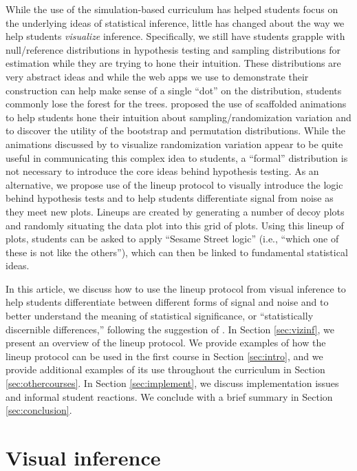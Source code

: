 \documentclass[12pt]{article}
\begin{document}
While the use of the simulation-based curriculum has helped students
focus on the underlying ideas of statistical inference, little has
changed about the way we help students \emph{visualize} inference.
Specifically, we still have students grapple with null/reference
distributions in hypothesis testing and sampling distributions for
estimation while they are trying to hone their intuition. These
distributions are very abstract ideas and while the web apps we use to
demonstrate their construction can help make sense of a single ``dot''
on the distribution, students commonly lose the forest for the trees.
\citet{wild2017} proposed the use of scaffolded animations to help
students hone their intuition about sampling/randomization variation and
to discover the utility of the bootstrap and permutation distributions.
While the animations discussed by \citet{wild2017} to visualize
randomization variation appear to be quite useful in communicating this
complex idea to students, a ``formal'' distribution is not necessary to
introduce the core ideas behind hypothesis testing. As an alternative,
we propose use of the lineup protocol \citep{Buja-2009bd} to visually
introduce the logic behind hypothesis tests and to help students
differentiate signal from noise as they meet new plots. Lineups are
created by generating a number of decoy plots and randomly situating the
data plot into this grid of plots. Using this lineup of plots, students
can be asked to apply ``Sesame Street logic'' (i.e., ``which one of
these is not like the others''), which can then be linked to fundamental
statistical ideas.

In this article, we discuss how to use the lineup protocol from visual
inference to help students differentiate between different forms of
signal and noise and to better understand the meaning of statistical
significance, or ``statistically discernible differences,'' following
the suggestion of \citet{Witmer2019-qg}. In Section \ref{sec:vizinf}, we
present an overview of the lineup protocol. We provide examples of how
the lineup protocol can be used in the first course in Section
\ref{sec:intro}, and we provide additional examples of its use
throughout the curriculum in Section \ref{sec:othercourses}. In Section
\ref{sec:implement}, we discuss implementation issues and informal
student reactions. We conclude with a brief summary in Section
\ref{sec:conclusion}.

\hypertarget{visual-inference}{%
\section{Visual inference}\label{visual-inference}}
\end{document}
